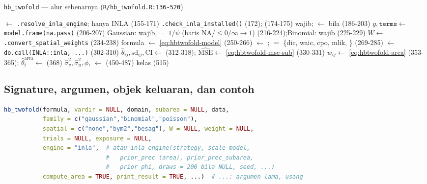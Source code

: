 \begin{algorithm}[htbp]
\caption{\texttt{hb\_twofold} --- alur sebenarnya (\texttt{R/hb\_twofold.R:136-520})}
\label{alg:hbtwofold}
 $\leftarrow$ \texttt{.resolve\_inla\_engine}; hanya INLA (155-171)\;
\texttt{.check\_inla\_installed()} (172);\quad {} (174-175)\;
 wajib;\quad {} $\leftarrow$  bila  (186-203)\;
$y,\texttt{terms}\leftarrow$ \texttt{model.frame(na.pass)} (206-207)\;
Gaussian:  wajib,  $=1/\psi$ (baris NA/$\le0/\infty
  \to1$) (216-224);\quad Binomial:  wajib (225-229)\;
$W\leftarrow$ \texttt{.convert\_spatial\_weights} (234-238)\;
formula $\leftarrow$ \eqref{eq:hbtwofold-model} (250-266)\;
 $\leftarrow$ ;\quad {}
  $=$ \{dic, waic, cpo, mlik, \} (269-285)\;
 $\leftarrow$ \texttt{do.call(INLA::inla, ...)} (302-310)\;
$\hat\theta_{ij},\mathrm{sd}_{ij},\mathrm{CI}\leftarrow$ (312-318);
  $\widehat{\mathrm{MSE}}\leftarrow$ \eqref{eq:hbtwofold-mse-sub} (330-331)\;
$w_{ij}\leftarrow$ \eqref{eq:hbtwofold-area} (353-365);\quad
  $\hat\theta^{\text{area}}_i\leftarrow$ (368)\;
\;
$\hat\sigma_v^2,\hat\sigma_u^2,\phi$,  $\leftarrow$ (450-487)\;
kelas  (515)\;
\end{algorithm}

\subsection{Signature, argumen, objek keluaran, dan contoh}\label{sec:hbtwofold-api}

\begin{lstlisting}[language=R,caption={Signature \texttt{hb\_twofold} (\texttt{R/hb\_twofold.R:136-153}).}]
hb_twofold(formula, vardir = NULL, domain, subarea = NULL, data,
           family = c("gaussian","binomial","poisson"),
           spatial = c("none","bym2","besag"), W = NULL, weight = NULL,
           trials = NULL, exposure = NULL,
           engine = "inla",  # atau inla_engine(strategy, scale_model,
                             #   prior_prec (area), prior_prec_subarea,
                             #   prior_phi, draws = 200 bila NULL, seed, ...)
           compute_area = TRUE, print_result = TRUE, ...)  # ...: argumen lama, usang
\end{lstlisting}

